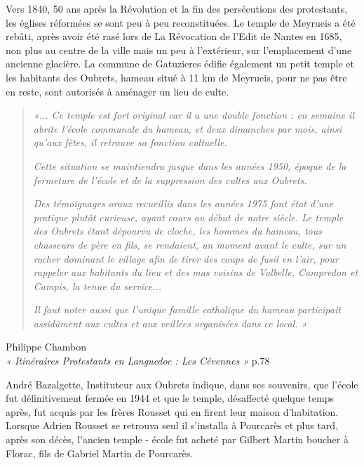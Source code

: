 

Vers 1840, 50 ans après la Révolution et la fin des persécutions des protestants,
les églises réformées se sont peu à peu reconstituées. Le temple de Meyrueis a été
rebâti, après avoir été rasé lors de La Révocation de l’Edit de Nantes en 1685, non
plus au centre de la ville mais un peu à l’extérieur, sur l’emplacement d’une ancienne
glacière. La commune de Gatuzieres édifie également un petit temple et les habitants
des Oubrets, hameau situé à 11 km de Meyrueis, pour ne pas être en reste, sont
autorisés à aménager un lieu de culte.

\begin{quote}
\textit{«... Ce temple est fort original car il a une double fonction : en semaine il
abrite l’école communale du hameau, et deux dimanches par mois, ainsi qu’aux fêtes,
il retrouve sa fonction cultuelle.}

\textit{Cette situation se maintiendra jusque dans les années 1950, époque de la fermeture
de l’école et de la suppression des cultes aux Oubrets.}

\textit{Des témoignages oraux recueillis dans les années 1975 font état d’une pratique
plutôt curieuse, ayant cours au début de notre siècle. Le temple des Oubrets étant
dépourvu de cloche, les hommes du hameau, tous chasseurs de père en fils, se
rendaient, un moment avant le culte, sur un rocher dominant le village afin de tirer
des coups de fusil en l’air, pour rappeler aux habitants du lieu et des mas voisins de
Valbelle, Campredon et Campis, la tenue du service...}

\textit{Il faut noter aussi que l’unique famille catholique du hameau participait assidûment
aux cultes et aux veillées organisées dans ce local. »}
\end{quote}

\begin{flushright}
Philippe Chambon\\
\textit{« Itinéraires Protestants en Languedoc : Les Cévennes »} p.78
\end{flushright}

André Bazalgette, Instituteur aux Oubrets indique, dans ses souvenirs, que l’école fut
définitivement fermée en 1944 et que le temple, désaffecté quelque temps après, fut acquis
par les frères Rousset qui en firent leur maison d’habitation. Lorsque Adrien Rousset se
retrouva seul il s’installa à Pourcarès et plus tard, après son décès, l’ancien temple - école fut
acheté par Gilbert Martin boucher à Florac, fils de Gabriel Martin de Pourcarès.
